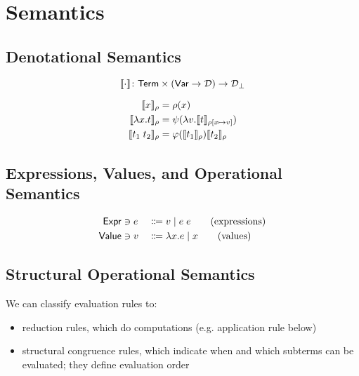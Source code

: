 \usetikzlibrary{shapes}

\chapter{Semantics}

\section{Denotational Semantics}

\[
\llbracket\cdot\rrbracket \colon
  \mathsf{Term} \times (\mathsf{Var} \rightarrow \mathcal{D})
    \rightarrow \mathcal{D}_{\bot}
\]

\begin{alignat*}{2}
  \llbracket x\rrbracket_\rho & = \rho(x) \\
  \llbracket\lambda x.t\rrbracket_\rho & =
    \psi(\mathbf{\lambda} v. \llbracket t\rrbracket_{\rho [x \mapsto v]}) \\
  \llbracket t_1 \; t_2\rrbracket_\rho & =
    \varphi(\llbracket t_1\rrbracket_\rho) \llbracket t_2\rrbracket_\rho
\end{alignat*}

\section{Expressions, Values, and Operational Semantics}

\begin{alignat*}{2}
  \mathsf{Expr}  & \ni e && \Coloneqq v \mid e\;e         \tag{expressions} \\
  \mathsf{Value} & \ni v && \Coloneqq \lambda x.e \mid x  \tag{values}
\end{alignat*}

\section{Structural Operational Semantics}

We can classify evaluation rules to:
\begin{itemize}
    \item reduction rules, which do computations (e.g. application rule below)
    \item structural congruence rules, which indicate when and which subterms can be evaluated;
        they define evaluation order
\end{itemize}

